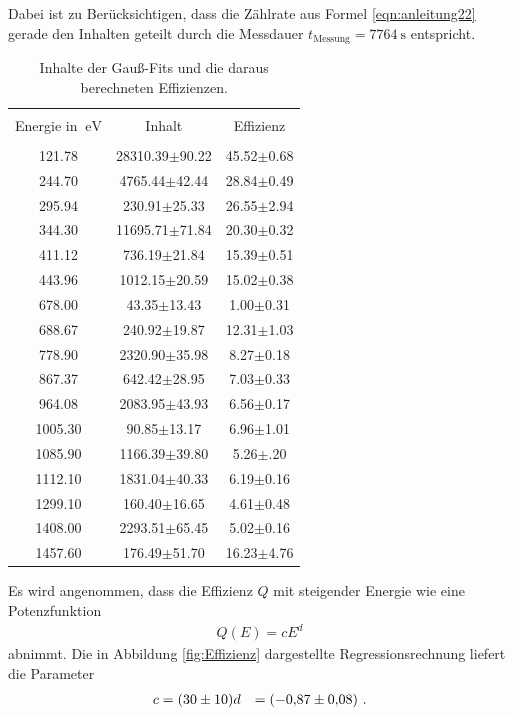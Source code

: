 Dabei ist zu Berücksichtigen, dass die Zählrate aus Formel \ref{eqn:anleitung22} gerade den Inhalten geteilt durch die Messdauer $t_\text{Messung}=\SI{7764}{\second}$ entspricht.
\begin{table}
\centering
\caption{Inhalte der Gauß-Fits und die daraus berechneten Effizienzen.}
\begin{tabular}{c c c}
\hline \\
Energie in $\SI{}{\electronvolt}$ & Inhalt & Effizienz\\
\hline \\
121.78 & 28310.39$\pm$90.22 & 45.52$\pm$0.68 \\ 244.70 & 4765.44$\pm$42.44 & 28.84$\pm$0.49 \\ 295.94 & 230.91$\pm$25.33 & 26.55$\pm$2.94 \\ 344.30 & 11695.71$\pm$71.84 & 20.30$\pm$0.32 \\ 411.12 & 736.19$\pm$21.84 & 15.39$\pm$0.51 \\ 443.96 & 1012.15$\pm$20.59 & 15.02$\pm$0.38 \\ 678.00 & 43.35$\pm$13.43 & 1.00$\pm$0.31 \\ 688.67 & 240.92$\pm$19.87 & 12.31$\pm$1.03 \\ 778.90 & 2320.90$\pm$35.98 & 8.27$\pm$0.18 \\ 867.37 & 642.42$\pm$28.95 & 7.03$\pm$0.33 \\ 964.08 & 2083.95$\pm$43.93 & 6.56$\pm$0.17 \\ 1005.30 & 90.85$\pm$13.17 & 6.96$\pm$1.01 \\ 1085.90 & 1166.39$\pm$39.80 & 5.26$\pm$.20 \\ 1112.10 & 1831.04$\pm$40.33 & 6.19$\pm$0.16 \\ 1299.10 & 160.40$\pm$16.65 & 4.61$\pm$0.48 \\ 1408.00 & 2293.51$\pm$65.45 & 5.02$\pm$0.16 \\ 1457.60 & 176.49$\pm$51.70 & 16.23$\pm$4.76\\
\hline
\end{tabular}
\label{tab:atab2}
\end{table}
Es wird angenommen, dass die Effizienz $Q$ mit steigender Energie wie eine Potenzfunktion
\begin{align}
Q(E)=c E^{d}
\end{align}
abnimmt.
Die in Abbildung \ref{fig:Effizienz} dargestellte Regressionsrechnung liefert die Parameter
\begin{align*}
c&=\SI{30+-10}{}
d&=\SI{-0.87+-0.08}{}\text{ .}
\end{align*}
